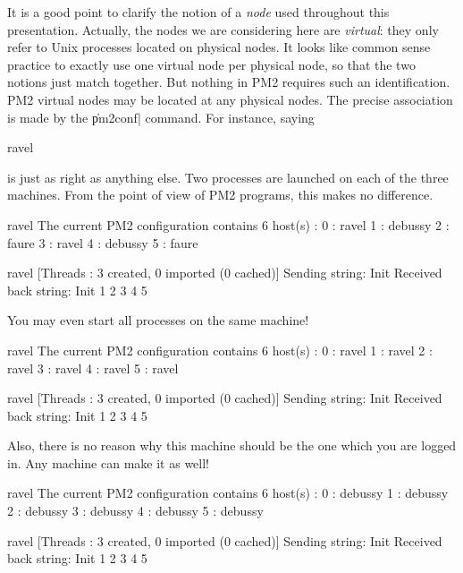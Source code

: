It is a good point to clarify the notion of a \emph{node} used
throughout this presentation. Actually, the nodes we are considering
here are \emph{virtual}: they only refer to Unix processes located on
physical nodes. It looks like common sense practice to exactly use one
virtual node per physical node, so that the two notions just match
together. But nothing in PM2 requires such an identification. PM2
virtual nodes may be located at any physical nodes. The precise
association is made by the \|pm2conf| command. For instance, saying
\begin{shell}
ravel%
\end{shell}
is just as right as anything else. Two processes are launched on each
of the three machines. From the point of view of PM2 programs, this
makes no difference.
\begin{shell}
ravel%
The current PM2 configuration contains 6 host(s) :
0 : ravel
1 : debussy
2 : faure
3 : ravel
4 : debussy
5 : faure

ravel%
[Threads : 3 created, 0 imported (0 cached)]
Sending string: Init
Received back string: Init 1 2 3 4 5
\end{shell}
You may even start all processes on the same machine!
\begin{shell}
ravel%
The current PM2 configuration contains 6 host(s) :
0 : ravel
1 : ravel
2 : ravel
3 : ravel
4 : ravel
5 : ravel

ravel%
[Threads : 3 created, 0 imported (0 cached)]
Sending string: Init
Received back string: Init 1 2 3 4 5
\end{shell}
Also, there is no reason why this machine should be the one which you
are logged in. Any machine can make it as well!
\begin{shell}
ravel%
The current PM2 configuration contains 6 host(s) :
0 : debussy
1 : debussy
2 : debussy
3 : debussy
4 : debussy
5 : debussy

ravel%
[Threads : 3 created, 0 imported (0 cached)]
Sending string: Init
Received back string: Init 1 2 3 4 5
\end{shell}
